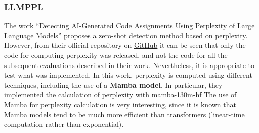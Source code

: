 \subsubsection{LLMPPL}
The work “Detecting AI-Generated Code Assignments Using Perplexity 
of Large Language Models” proposes a zero-shot detection method based 
on perplexity. However, from their official repository on 
\href{https://github.com/Arrtourz/llmppl}{GitHub} 
it can be seen that only the code for computing perplexity was released, 
and not the code for all the subsequent evaluations described in their 
work. Nevertheless, it is appropriate to test what was implemented. 
In this work, perplexity is computed using different techniques, 
including the use of a \textbf{Mamba model}. 
In particular, they implemented the calculation of 
perplexity with \href{https://huggingface.co/state-spaces/mamba-130m-hf}{mamba-130m-hf}
The use of Mamba for perplexity 
calculation is very interesting, since it is known that Mamba models 
tend to be much more efficient than transformers 
(linear-time computation rather than exponential).

